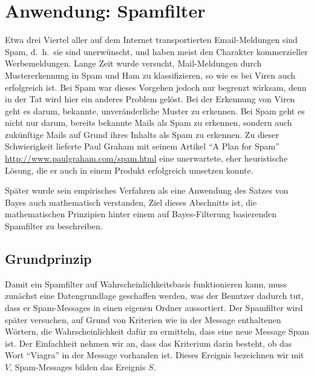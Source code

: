 %
%
%
\section{Anwendung: Spamfilter} \label{spamfilter}
Etwa drei Viertel aller auf dem Internet transportierten Email-Meldungen
sind Spam, d.~h.~sie sind unerwünscht, und haben meist den Charakter
kommerzieller Werbemeldungen.
Lange Zeit wurde versucht, Mail-Meldungen
durch Mustererkennung in Spam und Ham zu klassifizieren, so wie es bei
Viren auch erfolgreich ist.
Bei Spam war dieses Vorgehen jedoch nur begrenzt
wirksam, denn in der Tat wird hier ein anderes Problem gelöst.
Bei der Erkennung von Viren geht es darum, bekannte, unveränderliche
Muster zu erkennen.
Bei Spam geht es nicht nur darum, bereits bekannte
Mails als Spam zu erkennen, sondern auch zukünftige Mails auf Grund
ihres Inhalts als Spam zu erkennen.
Zu dieser Schwierigkeit lieferte
Paul Graham mit seinem Artikel ``A Plan for Spam'' \url{http://www.paulgraham.com/spam.html} eine unerwartete, eher heuristische Lösung, die er auch in
einem Produkt erfolgreich umsetzen konnte.

Später wurde sein empirisches Verfahren als eine Anwendung des Satzes von
Bayes auch mathematisch verstanden, Ziel dieses Abschnitts ist,
die mathematischen Prinzipien hinter einem auf Bayes-Filterung
basierenden Spamfilter zu beschreiben.

\subsection{Grundprinzip}
Damit ein Spamfilter auf Wahrscheinlichkeitsbasis funktionieren kann, muss
zunächst eine Datengrundlage geschaffen werden, was der Benutzer dadurch
tut, dass er Spam-Messages in einen eigenen Ordner aussortiert.
Der Spamfilter wird später versuchen, auf Grund von Kriterien wie in
der Message enthaltenen Wörtern, die Wahrscheinlichkeit dafür zu ermitteln,
dass eine neue Message Spam ist.
Der Einfachheit nehmen wir an, dass
das Kriterium darin besteht, ob das Wort ``Viagra'' in der Message
vorhanden ist.
Dieses Ereignis bezeichnen wir mit $V$, Spam-Messages bilden
das Ereignis $S$.

